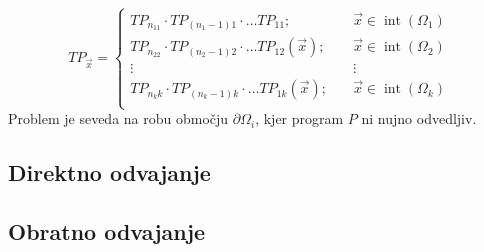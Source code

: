 \documentclass{article}
\DeclareMathOperator{\interior}{int}
\begin{document}
 \begin{equation}
   \label{eq:zlrprk_splosno}
   TP_{\vec{x}} =
   \begin{cases}
     TP_{n_11}\cdot TP_{(n_1-1)1}\cdot\ldots TP_{11};&\quad \vec{x}\in\interior(\Omega_1)\\
     TP_{n_22}\cdot TP_{(n_2-1)2}\cdot\ldots TP_{12}(\vec{x});&\quad \vec{x}\in\interior(\Omega_2)\\
     \vdots&\quad\vdots\\
     TP_{n_kk}\cdot TP_{(n_k-1)k}\cdot\ldots TP_{1k}(\vec{x});&\quad \vec{x}\in\interior(\Omega_k)\\
   \end{cases}
 \end{equation}
 Problem je seveda na robu območju $\partial\Omega_i$, kjer program $P$ ni nujno odvedljiv.

\subsection{Direktno odvajanje}
\subsection{Obratno odvajanje}
\end{document}
